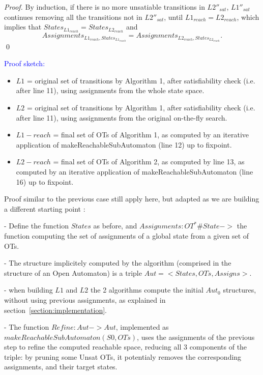 \documentclass[smallcondensed]{svjour3}
\newcommand{\ERIC}[1]{\textcolor{blue}{#1}}
\begin{document}
\begin{proof}
By induction, if there is no more unsatiable transitions in $L2''_{sat}$, $L1''_{sat}$ continues removing all the transitions not in $L2''_{sat}$, until $L1_{reach}=L2_{reach}$, which implies that $States_{L1_{reach}}=States_{L2_{reach}}$ and
$$Assignments_{L1_{reach},States_{L1_{reach}}}=Assignments_{L2_{reach},States_{L2_{reach}}}.$$
\hfill\qed
\end{proof}

\ERIC{Proof sketch:}
  
  \begin{itemize}
   \item $L1$ = original set of transitions by Algorithm 1, after
      satisfiability check (i.e. after line 11), using assignments
      from the whole state space.
   \item $L2$ = original set of transitions by Algorithm 1, after
      satisfiability check (i.e. after line 11), using assignments
      from the original on-the-fly search.

    \item $L1-reach$ = final set of OTs of Algorithm 1, as computed
        by an iterative application of makeReachableSubAutomaton (line
        12) up to fixpoint.
      \item $L2-reach$ = final set of OTs of Algorithm 2, as computed
          by line 13, as computed
        by an iterative application of makeReachableSubAutomaton (line
        16) up to fixpoint.
  \end{itemize}

  Proof similar to the previous case still apply here, but adapted as
  we are building a different starting point :
  
  - Define the function $States$ as before, and  $Assignments : OT^* \# State -> $ the function
  computing the set of assignments of a global state from a given set of OTs.

  - The structure implicitely computed by the algorithm (comprised in
  the structure of an Open Automaton) is a triple $ Aut= <States, OTs,
  Assigns>$.

  - when building $L1$ and $L2$ the 2 algorithms compute the initial
  $Aut_0$ structures, without using previous assignments, as
  explained in section~\ref{section:implementation}.
  
  - The function $Refine : Aut->Aut$, implemented as
  $makeReachableSubAutomaton(S0,OTs)$, uses the assignments of the
  previous step to refine the computed reachable space, reducing all 3
  components of the triple: by pruning some Unsat OTs, it potentialy
  removes the corresponding assignments, and their target states.
\end{document}
